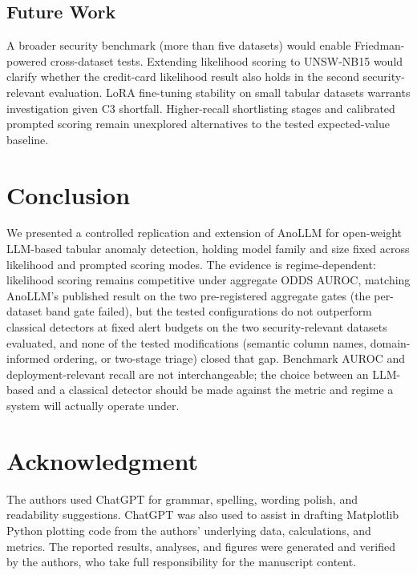 \documentclass[conference]{IEEEtran}
\begin{document}
\subsection{Future Work}
A broader security benchmark (more than five datasets) would enable Friedman-powered cross-dataset tests.
Extending likelihood scoring to UNSW-NB15 would clarify whether the credit-card likelihood result also holds in the second security-relevant evaluation.
LoRA fine-tuning stability on small tabular datasets warrants investigation given C3 shortfall.
Higher-recall shortlisting stages and calibrated prompted scoring remain unexplored alternatives to the tested expected-value baseline.

\section{Conclusion}\label{sec:conclusion}
We presented a controlled replication and extension of AnoLLM for open-weight LLM-based tabular anomaly detection, holding model family and size fixed across likelihood and prompted scoring modes.
The evidence is regime-dependent: likelihood scoring remains competitive under aggregate ODDS AUROC, matching AnoLLM's published result on the two pre-registered aggregate gates (the per-dataset band gate failed), but the tested configurations do not outperform classical detectors at fixed alert budgets on the two security-relevant datasets evaluated, and none of the tested modifications (semantic column names, domain-informed ordering, or two-stage triage) closed that gap.
Benchmark AUROC and deployment-relevant recall are not interchangeable; the choice between an LLM-based and a classical detector should be made against the metric and regime a system will actually operate under.

\section*{Acknowledgment}
The authors used ChatGPT for grammar, spelling, wording polish, and readability suggestions. ChatGPT was also used to assist in drafting Matplotlib Python plotting code from the authors' underlying data, calculations, and metrics. The reported results, analyses, and figures were generated and verified by the authors, who take full responsibility for the manuscript content.



\end{document}

